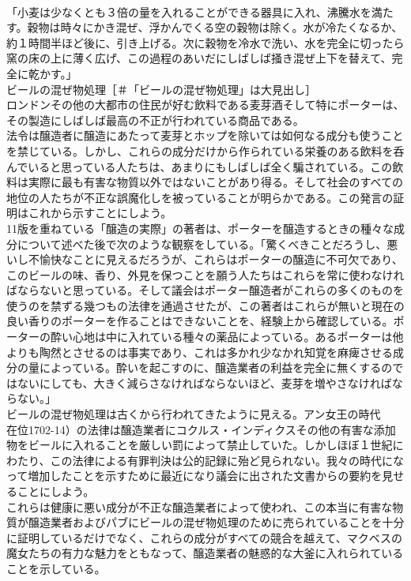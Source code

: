 \documentclass[8pt]{extreport}
\begin{document}
\begin{CJK}{UTF8}{min}
\\	「小麦は少なくとも３倍の量を入れることができる器具に入れ、沸騰水を満たす。穀物は時々にかき混ぜ、浮かんでくる空の穀物は除く。水が冷たくなるか、約１時間半ほど後に、引き上げる。次に穀物を冷水で洗い、水を完全に切ったら窯の床の上に薄く広げ、この過程のあいだにしばしば掻き混ぜ上下を替えて、完全に乾かす。」
\\	ビールの混ぜ物処理［＃「ビールの混ぜ物処理」は大見出し］
\\	ロンドンその他の大都市の住民が好む飲料である麦芽酒そして特にポーターは、その製造にしばしば最高の不正が行われている商品である。
\\	法令は醸造者に醸造にあたって麦芽とホップを除いては如何なる成分も使うことを禁じている。しかし、これらの成分だけから作られている栄養のある飲料を呑んでいると思っている人たちは、あまりにもしばしば全く騙されている。この飲料は実際に最も有害な物質以外ではないことがあり得る。そして社会のすべての地位の人たちが不正な誤魔化しを被っていることが明らかである。この発言の証明はこれから示すことにしよう。
\\	11版を重ねている「醸造の実際」の著者は、ポーターを醸造するときの種々な成分について述べた後で次のような観察をしている。「驚くべきことだろうし、悪いし不愉快なことに見えるだろうが、これらはポーターの醸造に不可欠であり、このビールの味、香り、外見を保つことを願う人たちはこれらを常に使わなければならないと思っている。そして議会はポーター醸造者がこれらの多くのものを使うのを禁ずる幾つもの法律を通過させたが、この著者はこれらが無いと現在の良い香りのポーターを作ることはできないことを、経験上から確認している。ポーターの酔い心地は中に入れている種々の薬品によっている。あるポーターは他よりも陶然とさせるのは事実であり、これは多かれ少なかれ知覚を麻痺させる成分の量によっている。酔いを起こすのに、醸造業者の利益を完全に無くするのではないにしても、大きく減らさなければならないほど、麦芽を増やさなければならない。」
\\	ビールの混ぜ物処理は古くから行われてきたように見える。アン女王の時代
\\	在位1702-14）の法律は醸造業者にコクルス・インディクスその他の有害な添加物をビールに入れることを厳しい罰によって禁止していた。しかしほぼ１世紀にわたり、この法律による有罪判決は公的記録に殆ど見られない。我々の時代になって増加したことを示すために最近になり議会に出された文書からの要約を見せることにしよう。
\\	これらは健康に悪い成分が不正な醸造業者によって使われ、この本当に有害な物質が醸造業者およびパブにビールの混ぜ物処理のために売られていることを十分に証明しているだけでなく、これらの成分がすべての競合を越えて、マクベスの魔女たちの有力な魅力をともなって、醸造業者の魅惑的な大釜に入れられていることを示している。

\end{CJK}
\end{document}
